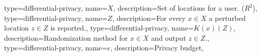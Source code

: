 
{
  type=differential-privacy,
  name={$\ensuremath{X} $},
  description={Set of locations for a user. ($R^2$)},
}
{
  type=differential-privacy,
  name={$\ensuremath{Z} $},
  description={For every $x \in X$ a perturbed location $z \in Z$ is reported.},
}
{
  type=differential-privacy,
  name={$K(x)(Z)$},
  description={Randomization method for $x \in X$ and output $z \in Z$.},
}
{
  type=differential-privacy,
  name={$\ensuremath{\epsilon} $},
  description={Privacy budget},
}

